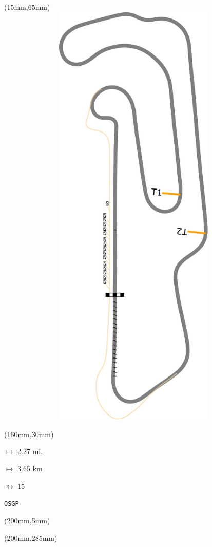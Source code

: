 \begin{textblock*}{185mm}(15mm,65mm)%
\centering
\mbox{\includegraphics[width=185mm,height=210mm,keepaspectratio]{PT/OSGP.pdf}}
\end{textblock*}
\begin{textblock*}{40mm}(160mm,30mm)%
\Large
\par$\mapsto$ 2.27 mi.
\par$\mapsto$ 3.65 km
\par$\looparrowright$ 15
\par\hfill\tiny\tt OSGP\\
\end{textblock*}
\begin{textblock*}{20mm}(200mm,5mm)%
\fbox{\thepage}
\label{OSGP}
\end{textblock*}
\begin{textblock*}{20mm}(200mm,285mm)%
\fbox{\thepage}
\end{textblock*}

